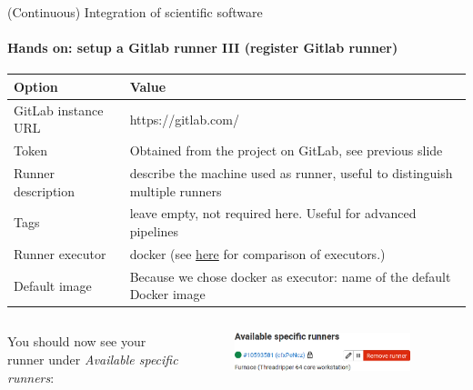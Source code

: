 \begin{frame}{(Continuous) Integration of scientific software}
    \framesubtitle{Hands on: setup a Gitlab runner III (register Gitlab runner)}
    \begin{table}
        \begin{tabularx}{\textwidth}{l|X}
            \textbf{Option}              & \textbf{Value} \\
            \hline
            GitLab instance URL & https://gitlab.com/ \\
            Token               & Obtained from the project on GitLab, see previous slide \\
            Runner description  & describe the machine used as runner, useful to distinguish multiple runners \\
            Tags                & leave empty, not required here. Useful for advanced pipelines \\
            Runner executor     & docker (see \href{https://docs.gitlab.com/runner/executors/}{here} for comparison of executors.)\\
            Default image       & Because we chose docker as executor: name of the default Docker image
        \end{tabularx}
    \end{table}
    \begin{columns}[t]
        \begin{column}{0.5\textwidth}
        You should now see your runner under \newline \emph{Available specific runners}:
        \end{column}

        \begin{column}{0.5\textwidth}
            \begin{figure}[T!]
                \includegraphics[width=0.9\textwidth]{figures/runner-registered.png}
            \end{figure}
        \end{column}
    \end{columns}
\end{frame}


